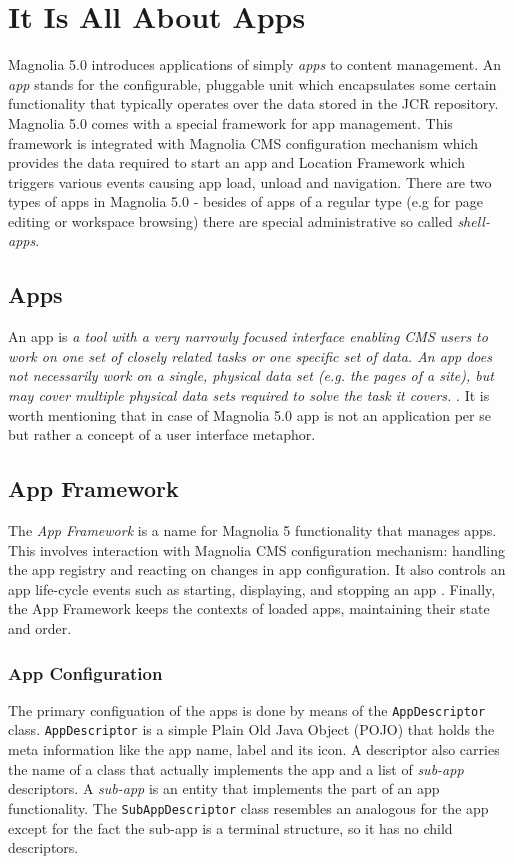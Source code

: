 \section{It Is All About Apps}
\label{section_apps}
Magnolia 5.0 introduces applications of simply \emph{apps} to content
management. An \emph{app} stands for the configurable, pluggable unit which
encapsulates some certain functionality that typically operates over the data
stored in the JCR repository.
Magnolia 5.0 comes with a special framework for app management. This framework
is integrated with Magnolia CMS configuration mechanism which provides the
data required to start an app and Location Framework which triggers various
events causing app load, unload and navigation. 
There are two types of apps in Magnolia 5.0 - besides of apps of a regular type
(e.g for page editing or workspace browsing) there are special administrative so
called \emph{shell-apps}.

\subsection{Apps} An app is \emph{a tool with a very narrowly focused interface
enabling CMS users to work on one set of closely related tasks or one specific
set of data. An app does not necessarily work on a single, physical data set
(e.g. the pages of a site), but may cover multiple physical data sets required
to solve the task it covers.} \cite{maui_apps}. It is worth mentioning that in
case of Magnolia 5.0 app is not an application per se but rather a concept of a
user interface metaphor.

\subsection{App Framework}
The \emph{App Framework} is a name for Magnolia 5 functionality that manages
apps. This involves interaction with Magnolia CMS configuration mechanism:
handling the app registry and reacting on changes in app configuration.
It also controls an app life-cycle events such as starting, displaying, and
stopping an app \cite{wiki_app_framework}. Finally, the App Framework keeps the contexts of loaded apps,
maintaining their state and order.

\subsubsection{App Configuration}
The primary configuation of the apps is done by means of the
\texttt{AppDescriptor} class. \texttt{AppDescriptor} is a simple Plain Old Java
Object (POJO) that holds the meta information like the app name, label and its
icon. A descriptor also carries the name of a class that actually implements the
app and a list of \emph{sub-app} descriptors. A \emph{sub-app} is an entity that
implements the part of an app functionality. The \texttt{SubAppDescriptor} class
resembles an analogous for the app except for the fact the sub-app is a terminal
structure, so it has no child descriptors. 

